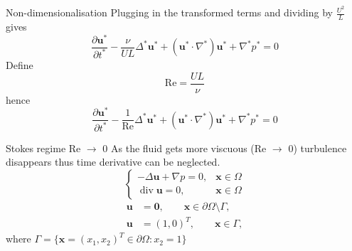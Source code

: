 \documentclass[aspectratio=169]{beamer}
\begin{document}
\begin{frame}{\Large Non-dimensionalisation}
  \Large
  Plugging in the transformed terms and dividing by $\frac{U^2}{L}$ gives
  \begin{equation*}
      \frac{\partial \mathbf{u}^*}{\partial t^*} 
      - \frac{\nu}{UL} \Delta^* \mathbf{u}^* 
      + (\mathbf{u}^* \cdot \nabla^*)\mathbf{u}^* 
      + \nabla^* p^* = 0
  \end{equation*}
  Define
  \begin{equation*}
    \mathrm{Re} = \frac{UL}{\nu}
  \end{equation*}
  hence
  \begin{equation*}
      \frac{\partial \mathbf{u}^*}{\partial t^*} 
      - \frac{1}{\mathrm{Re}} \Delta^* \mathbf{u}^* 
      + (\mathbf{u}^* \cdot \nabla^*)\mathbf{u}^* 
      + \nabla^* p^* = 0
  \end{equation*}
\end{frame}


\begin{frame}{\Large Stokes regime Re $\rightarrow$ 0}
  \Large
  As the fluid gets more viscuous (Re $\rightarrow$ 0) turbulence disappears
  thus time derivative can be neglected.
  \begin{equation*}
    \begin{cases}
      -\Delta \mathbf{u} 
      + \nabla p = 0, & \mathbf{x} \in \Omega \\[5pt]
      \operatorname{div} \mathbf{u} = 0, & \mathbf{x} \in \Omega
    \end{cases}
  \end{equation*}
  \begin{align*}
    \mathbf{u} &= \mathbf{0}, \qquad\mathbf{x} \in \partial\Omega \setminus \varGamma, \\[5pt]
    \mathbf{u} &= (1,0)^T, \qquad \mathbf{x} \in \varGamma,
  \end{align*}
  \centering
  where $\varGamma = \{\mathbf{x} = (x_1, x_2)^T \in \partial \Omega: x_2 = 1\}$
\end{frame}
\end{document}
